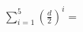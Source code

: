 \documentclass[preview]{standalone}
\begin{document}
\begin{align*}
\sum_{i=1}^5 \left(\frac{d}{2}\right)^i=
\end{align*}
\end{document}
